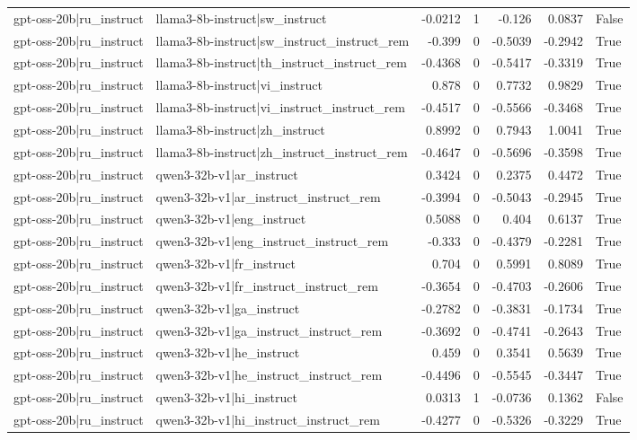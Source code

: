 \begin{table}
\begin{tabular}{l l r r r r l}
gpt-oss-20b|ru_instruct & llama3-8b-instruct|sw_instruct & -0.0212 & 1 & -0.126 & 0.0837 & False \\
gpt-oss-20b|ru_instruct & llama3-8b-instruct|sw_instruct_instruct_rem & -0.399 & 0 & -0.5039 & -0.2942 & True \\
gpt-oss-20b|ru_instruct & llama3-8b-instruct|th_instruct_instruct_rem & -0.4368 & 0 & -0.5417 & -0.3319 & True \\
gpt-oss-20b|ru_instruct & llama3-8b-instruct|vi_instruct & 0.878 & 0 & 0.7732 & 0.9829 & True \\
gpt-oss-20b|ru_instruct & llama3-8b-instruct|vi_instruct_instruct_rem & -0.4517 & 0 & -0.5566 & -0.3468 & True \\
gpt-oss-20b|ru_instruct & llama3-8b-instruct|zh_instruct & 0.8992 & 0 & 0.7943 & 1.0041 & True \\
gpt-oss-20b|ru_instruct & llama3-8b-instruct|zh_instruct_instruct_rem & -0.4647 & 0 & -0.5696 & -0.3598 & True \\
gpt-oss-20b|ru_instruct & qwen3-32b-v1|ar_instruct & 0.3424 & 0 & 0.2375 & 0.4472 & True \\
gpt-oss-20b|ru_instruct & qwen3-32b-v1|ar_instruct_instruct_rem & -0.3994 & 0 & -0.5043 & -0.2945 & True \\
gpt-oss-20b|ru_instruct & qwen3-32b-v1|eng_instruct & 0.5088 & 0 & 0.404 & 0.6137 & True \\
gpt-oss-20b|ru_instruct & qwen3-32b-v1|eng_instruct_instruct_rem & -0.333 & 0 & -0.4379 & -0.2281 & True \\
gpt-oss-20b|ru_instruct & qwen3-32b-v1|fr_instruct & 0.704 & 0 & 0.5991 & 0.8089 & True \\
gpt-oss-20b|ru_instruct & qwen3-32b-v1|fr_instruct_instruct_rem & -0.3654 & 0 & -0.4703 & -0.2606 & True \\
gpt-oss-20b|ru_instruct & qwen3-32b-v1|ga_instruct & -0.2782 & 0 & -0.3831 & -0.1734 & True \\
gpt-oss-20b|ru_instruct & qwen3-32b-v1|ga_instruct_instruct_rem & -0.3692 & 0 & -0.4741 & -0.2643 & True \\
gpt-oss-20b|ru_instruct & qwen3-32b-v1|he_instruct & 0.459 & 0 & 0.3541 & 0.5639 & True \\
gpt-oss-20b|ru_instruct & qwen3-32b-v1|he_instruct_instruct_rem & -0.4496 & 0 & -0.5545 & -0.3447 & True \\
gpt-oss-20b|ru_instruct & qwen3-32b-v1|hi_instruct & 0.0313 & 1 & -0.0736 & 0.1362 & False \\
gpt-oss-20b|ru_instruct & qwen3-32b-v1|hi_instruct_instruct_rem & -0.4277 & 0 & -0.5326 & -0.3229 & True \\

\end{tabular}
\end{table}
